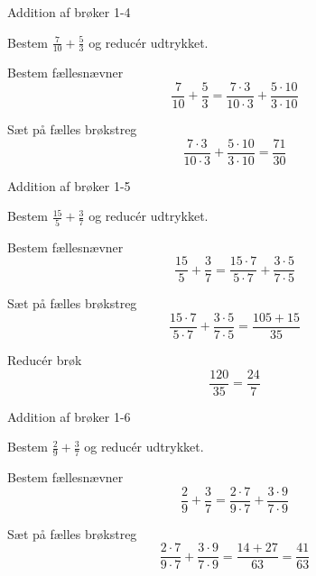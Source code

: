\documentclass{article}
\begin{document}
	\newpage
	
	\begin{exercise}{Addition af brøker 1-4}
		
		Bestem $\frac{7}{10}+\frac{5}{3}$ og reducér udtrykket.
		
		
		\hint
		
		Bestem fællesnævner
		\[
		\frac{7}{10}+\frac{5}{3}  = \frac{7 \cdot 3}{10 \cdot 3}+\frac{5 \cdot 10}{3\cdot 10} 
		\]
		
		\hint
		
		Sæt på fælles brøkstreg
		\[
		\frac{7 \cdot 3}{10 \cdot 3}+\frac{5 \cdot 10}{3\cdot 10}  = \frac{71}{30} 
		\]
		

		
	\end{exercise}
	
	\newpage
	
	\begin{exercise}{Addition af brøker 1-5}
		
		Bestem $\frac{15}{5}+\frac{3}{7}$ og reducér udtrykket.
		
		
		\hint
		
		Bestem fællesnævner
		\[
		\frac{15}{5}+\frac{3}{7}  = \frac{15 \cdot 7}{5 \cdot 7}+\frac{3 \cdot 5}{7\cdot 5} 
		\]
		
		\hint
		
		Sæt på fælles brøkstreg
		\[
	\frac{15 \cdot 7}{5 \cdot 7}+\frac{3 \cdot 5}{7\cdot 5}  = \frac{105+15}{35} 
		\]
		
		\hint
		
		Reducér brøk
		\[
		\frac{120}{35} = \frac{24}{7}
		\]
		
	\end{exercise}
	\newpage
	
	\begin{exercise}{Addition af brøker 1-6}
		
		Bestem $\frac{2}{9}+\frac{3}{7}$ og reducér udtrykket.
		
		
		\hint
		
		Bestem fællesnævner
		\[
		\frac{2}{9}+\frac{3}{7}  = \frac{2 \cdot 7}{9 \cdot 7}+\frac{3 \cdot 9}{7\cdot 9} 
		\]
		
		\hint
		
		Sæt på fælles brøkstreg
		\[
		 \frac{2 \cdot 7}{9 \cdot 7}+\frac{3 \cdot 9}{7\cdot 9}   = \frac{14+27}{63}  = \frac{41}{63}
		\]

		
	\end{exercise}
	\newpage
	
\end{document}
